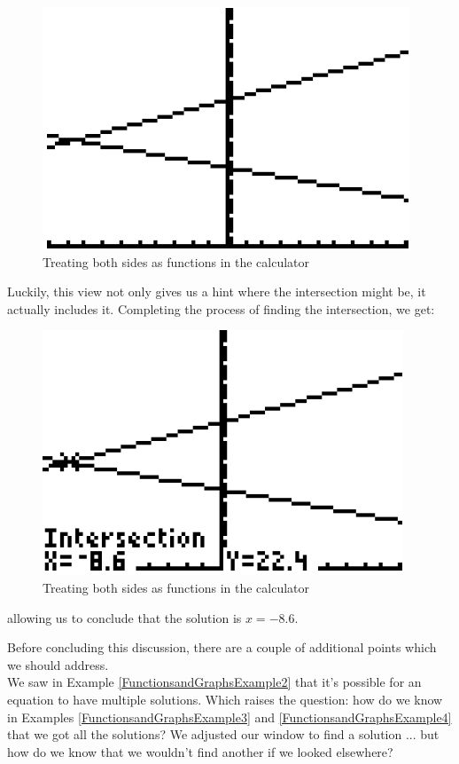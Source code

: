 {	\begin{figure}[H]
		\centering
		\includegraphics[scale=1.0]{Sections/SolvingEquationsGraphically/Figure23.png}
		\caption{Treating both sides as functions in the calculator}
	\end{figure}
	
	Luckily, this view not only gives us a hint where the intersection might be, it actually includes it.  Completing the process of finding the intersection, we get:
	
	\begin{figure}[H]
		\centering
		\includegraphics[scale=1.0]{Sections/SolvingEquationsGraphically/Figure24.png}
		\caption{Treating both sides as functions in the calculator}
	\end{figure}
	
	allowing us to conclude that the solution is $x=-8.6$.
}

Before concluding this discussion, there are a couple of additional points which we should address.\\

We saw in Example \ref{FunctionsandGraphsExample2} that it’s possible for an equation to have multiple solutions. Which raises the question: how do we know in Examples \ref{FunctionsandGraphsExample3} and \ref{FunctionsandGraphsExample4} that we got all the solutions? We adjusted our window to find a solution ... but how do we know that we wouldn’t find another if we looked elsewhere?\\

